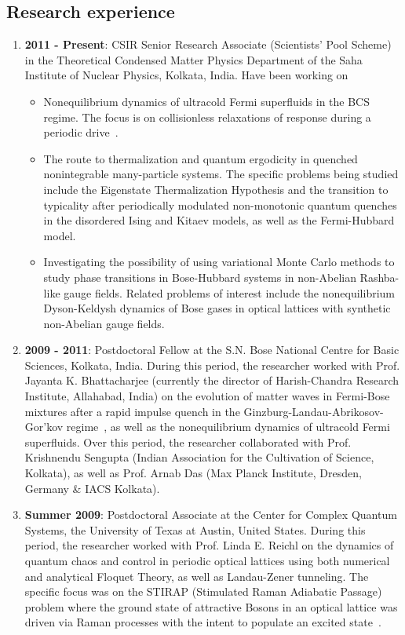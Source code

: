 \documentclass[a4paper,11pt,color]{article}
\begin{document}
\subsection{Research experience}
\label{sec:research_experience}
\begin{enumerate}
\item
\textbf{2011 - Present}: CSIR Senior Research Associate (Scientists' Pool Scheme) in the Theoretical Condensed Matter Physics Department of the Saha Institute of Nuclear Physics, Kolkata, India. Have been working on
\begin{itemize}
 \item 
Nonequilibrium dynamics of ultracold Fermi superfluids in the BCS regime. The focus is on collisionless relaxations of response during a  periodic drive~\cite{fermidyn}.
 \item
The route to thermalization and quantum ergodicity in quenched nonintegrable many-particle systems. The specific problems being studied include the Eigenstate Thermalization Hypothesis and the transition to typicality after periodically modulated non-monotonic quantum quenches in the disordered Ising and Kitaev models, as well as the Fermi-Hubbard model.
\item
Investigating the possibility of using variational Monte Carlo methods to study phase transitions in Bose-Hubbard systems in
non-Abelian Rashba-like gauge fields. Related problems of interest include the nonequilibrium Dyson-Keldysh dynamics of Bose gases in optical lattices with synthetic non-Abelian gauge fields.
\end{itemize}
\item
\textbf{2009 - 2011}: Postdoctoral Fellow at the S.N. Bose National Centre for Basic Sciences, Kolkata, India. During this period, the researcher worked with Prof. Jayanta K. Bhattacharjee (currently the director of Harish-Chandra Research Institute, Allahabad, India) on the evolution of matter waves in Fermi-Bose mixtures after a rapid impulse quench in the Ginzburg-Landau-Abrikosov-Gor'kov regime~\cite{colrev}, as well as the nonequilibrium dynamics of ultracold Fermi superfluids. Over this period, the researcher collaborated with Prof. Krishnendu Sengupta (Indian Association for the Cultivation of Science, Kolkata), as well as Prof. Arnab Das (Max Planck Institute, Dresden, Germany \& IACS Kolkata).
\item
\textbf{Summer 2009}: Postdoctoral Associate at the Center for Complex Quantum Systems, the University of Texas at Austin, United States. During this period, the researcher worked with Prof. Linda E. Reichl on the dynamics of quantum chaos and control in periodic optical lattices using both numerical and analytical Floquet Theory, as well as Landau-Zener tunneling. The specific focus was on the STIRAP (Stimulated Raman Adiabatic Passage) problem where the ground state of attractive Bosons in an optical lattice was driven via Raman processes with the intent to populate an excited state~\cite{floquet:oplattice}.

\end{enumerate}
\end{document}
